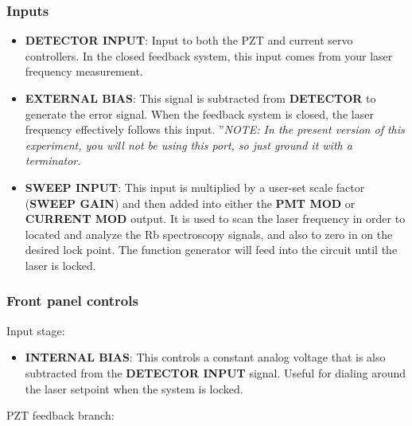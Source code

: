 \documentclass{../lab}
\begin{document}
\subsubsection{Inputs}

\begin{itemize}
    \item \textbf{DETECTOR INPUT}: Input to both the PZT and current servo controllers. In the closed feedback system, this input comes from your laser frequency measurement.

    \item \textbf{EXTERNAL BIAS}: This signal is subtracted from \textbf{DETECTOR} to generate the error signal. When the feedback system is closed, the laser frequency effectively follows this input. ''\emph{NOTE: In the present version of this experiment, you will not be using this port, so just ground it with a terminator.}

    \item \textbf{SWEEP INPUT}: This input is multiplied by a user-set scale factor (\textbf{SWEEP GAIN}) and then added into either the \textbf{PMT MOD} or \textbf{CURRENT MOD} output. It is used to scan the laser frequency in order to located and analyze the Rb spectroscopy signals, and also to zero in on the desired lock point. The function generator will feed into the circuit until the laser is locked.
\end{itemize}

\subsubsection{Front panel controls}

Input stage:

\begin{itemize}
    \item \textbf{INTERNAL BIAS}: This controls a constant analog voltage that is also subtracted from the \textbf{DETECTOR INPUT} signal. Useful for dialing around the laser setpoint when the system is locked.
\end{itemize}

PZT feedback branch:
\end{document}
